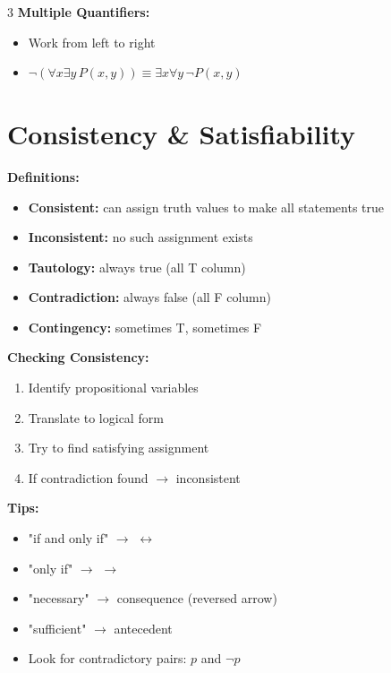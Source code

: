 \documentclass[8pt]{article}
\begin{document}
\begin{multicols}{3}
\textbf{Multiple Quantifiers:}
\begin{itemize}[nosep]
\item Work from left to right
\item $\neg(\forall x \exists y\, P(x,y)) \equiv \exists x \forall y\, \neg P(x,y)$
\end{itemize}

\section*{Consistency \& Satisfiability}
\textbf{Definitions:}
\begin{itemize}[nosep]
\item \textbf{Consistent:} can assign truth values to make all statements true
\item \textbf{Inconsistent:} no such assignment exists
\item \textbf{Tautology:} always true (all T column)
\item \textbf{Contradiction:} always false (all F column)
\item \textbf{Contingency:} sometimes T, sometimes F
\end{itemize}

\textbf{Checking Consistency:}
\begin{enumerate}[nosep]
\item Identify propositional variables
\item Translate to logical form
\item Try to find satisfying assignment
\item If contradiction found $\to$ inconsistent
\end{enumerate}

\textbf{Tips:}
\begin{itemize}[nosep]
\item "if and only if" $\to$ $\leftrightarrow$
\item "only if" $\to$ $\to$
\item "necessary" $\to$ consequence (reversed arrow)
\item "sufficient" $\to$ antecedent
\item Look for contradictory pairs: $p$ and $\neg p$
\end{itemize}


\end{multicols}
\end{document}
